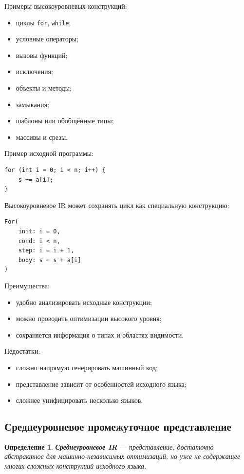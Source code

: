 \documentclass[12pt,a4paper]{article}
\newtheorem{definition}{Определение}
\begin{document}
Примеры высокоуровневых конструкций:
\begin{itemize}
    \item циклы \texttt{for}, \texttt{while};
    \item условные операторы;
    \item вызовы функций;
    \item исключения;
    \item объекты и методы;
    \item замыкания;
    \item шаблоны или обобщённые типы;
    \item массивы и срезы.
\end{itemize}

Пример исходной программы:

\begin{lstlisting}
for (int i = 0; i < n; i++) {
    s += a[i];
}
\end{lstlisting}

Высокоуровневое IR может сохранять цикл как специальную конструкцию:

\begin{lstlisting}
For(
    init: i = 0,
    cond: i < n,
    step: i = i + 1,
    body: s = s + a[i]
)
\end{lstlisting}

Преимущества:
\begin{itemize}
    \item удобно анализировать исходные конструкции;
    \item можно проводить оптимизации высокого уровня;
    \item сохраняется информация о типах и областях видимости.
\end{itemize}

Недостатки:
\begin{itemize}
    \item сложно напрямую генерировать машинный код;
    \item представление зависит от особенностей исходного языка;
    \item сложнее унифицировать несколько языков.
\end{itemize}

\subsection{Среднеуровневое промежуточное представление}

\begin{definition}
\textbf{Среднеуровневое IR} --- представление, достаточно абстрактное для машинно-независимых оптимизаций, но уже не содержащее многих сложных конструкций исходного языка.
\end{definition}
\end{document}
